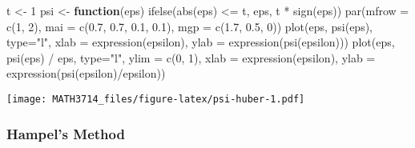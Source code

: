 \documentclass[
  a4paper,
]{article}
\newenvironment{Shaded}{\begin{snugshade}}{\end{snugshade}}
\newcommand{\AttributeTok}[1]{\textcolor[rgb]{0.77,0.63,0.00}{#1}}
\newcommand{\ControlFlowTok}[1]{\textcolor[rgb]{0.13,0.29,0.53}{\textbf{#1}}}
\newcommand{\DecValTok}[1]{\textcolor[rgb]{0.00,0.00,0.81}{#1}}
\newcommand{\FloatTok}[1]{\textcolor[rgb]{0.00,0.00,0.81}{#1}}
\newcommand{\FunctionTok}[1]{\textcolor[rgb]{0.00,0.00,0.00}{#1}}
\newcommand{\NormalTok}[1]{#1}
\newcommand{\OtherTok}[1]{\textcolor[rgb]{0.56,0.35,0.01}{#1}}
\newcommand{\SpecialCharTok}[1]{\textcolor[rgb]{0.00,0.00,0.00}{#1}}
\newcommand{\StringTok}[1]{\textcolor[rgb]{0.31,0.60,0.02}{#1}}
\theoremstyle{definition}
\theoremstyle{definition}
\theoremstyle{definition}
\theoremstyle{definition}
\theoremstyle{remark}
\begin{document}
\begin{Shaded}
\begin{Highlighting}[]
\NormalTok{t }\OtherTok{\textless{}{-}} \DecValTok{1}
\NormalTok{psi }\OtherTok{\textless{}{-}} \ControlFlowTok{function}\NormalTok{(eps) }\FunctionTok{ifelse}\NormalTok{(}\FunctionTok{abs}\NormalTok{(eps) }\SpecialCharTok{\textless{}=}\NormalTok{ t, eps, t }\SpecialCharTok{*} \FunctionTok{sign}\NormalTok{(eps))}
\FunctionTok{par}\NormalTok{(}\AttributeTok{mfrow =} \FunctionTok{c}\NormalTok{(}\DecValTok{1}\NormalTok{, }\DecValTok{2}\NormalTok{),}
    \AttributeTok{mai =} \FunctionTok{c}\NormalTok{(}\FloatTok{0.7}\NormalTok{, }\FloatTok{0.7}\NormalTok{, }\FloatTok{0.1}\NormalTok{, }\FloatTok{0.1}\NormalTok{),}
    \AttributeTok{mgp =} \FunctionTok{c}\NormalTok{(}\FloatTok{1.7}\NormalTok{, }\FloatTok{0.5}\NormalTok{, }\DecValTok{0}\NormalTok{))}
\FunctionTok{plot}\NormalTok{(eps, }\FunctionTok{psi}\NormalTok{(eps), }\AttributeTok{type=}\StringTok{"l"}\NormalTok{,}
     \AttributeTok{xlab =} \FunctionTok{expression}\NormalTok{(epsilon), }\AttributeTok{ylab =} \FunctionTok{expression}\NormalTok{(}\FunctionTok{psi}\NormalTok{(epsilon)))}
\FunctionTok{plot}\NormalTok{(eps, }\FunctionTok{psi}\NormalTok{(eps) }\SpecialCharTok{/}\NormalTok{ eps, }\AttributeTok{type=}\StringTok{"l"}\NormalTok{, }\AttributeTok{ylim =} \FunctionTok{c}\NormalTok{(}\DecValTok{0}\NormalTok{, }\DecValTok{1}\NormalTok{),}
     \AttributeTok{xlab =} \FunctionTok{expression}\NormalTok{(epsilon),}
     \AttributeTok{ylab =} \FunctionTok{expression}\NormalTok{(}\FunctionTok{psi}\NormalTok{(epsilon)}\SpecialCharTok{/}\NormalTok{epsilon))}
\end{Highlighting}
\end{Shaded}

\texttt{[image: MATH3714\_files/figure-latex/psi-huber-1.pdf]}

\hypertarget{hampels-method}{%
\subsubsection{Hampel's Method}\label{hampels-method}}
\end{document}
